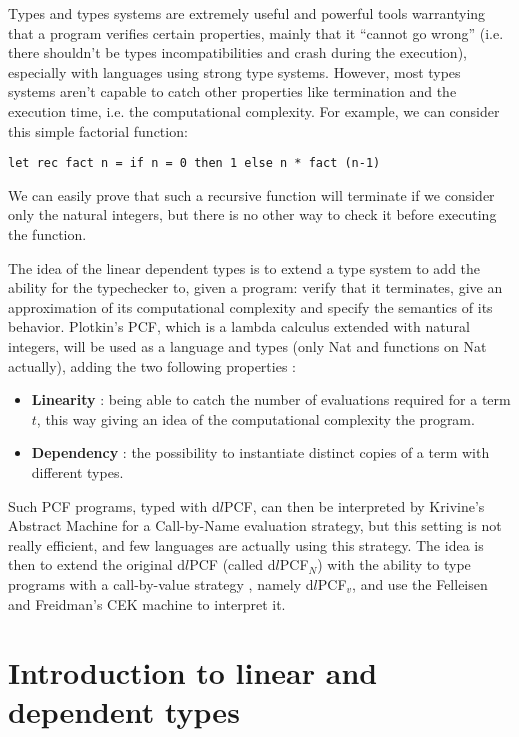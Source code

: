 \documentclass[a4paper,12pt]{article}
\begin{document}
Types and types systems are extremely useful and powerful tools
warrantying that a program verifies certain properties, mainly that
it ``cannot go wrong'' (i.e. there shouldn't be types
incompatibilities and crash during the execution), especially with
languages using strong type systems. However, most types systems
aren't capable to catch other properties like termination and the
execution time, i.e. the computational complexity. For example, we can
consider this simple factorial function:

\begin{verbatim}
let rec fact n = if n = 0 then 1 else n * fact (n-1)
\end{verbatim}

We can easily prove that such a recursive function will terminate if we consider
only the natural integers, but there is no other way to check it before
executing the function.

The idea of the linear dependent types \cite{ldtrc} is to extend a type system
to add the ability for the typechecker to, given a program: verify that it
terminates, give an approximation of its computational complexity and specify
the semantics of its behavior. Plotkin's PCF, which is a lambda calculus
extended with natural integers, will be used as a language and types (only Nat
and functions on Nat actually), adding the two following properties :

\begin{itemize}
\item \textbf{Linearity} : being able to catch the number of evaluations required
  for a term $t$, this way giving an idea of the computational complexity the
  program.
\item \textbf{Dependency} : the possibility to instantiate distinct copies of a term with
  different types.
\end{itemize}

Such PCF programs, typed with d$l$PCF, can then be interpreted by Krivine's
Abstract Machine for a Call-by-Name evaluation strategy, but this setting is not
really efficient, and few languages are actually using this strategy. The idea
is then to extend the original d$l$PCF (called d$l$PCF$_{N}$) with the ability to
type programs with a call-by-value strategy \cite{ldtcbv}, namely d$l$PCF$_{v}$,
  and use the Felleisen and Freidman's CEK machine to interpret it.

\section{Introduction to linear and dependent types}
\end{document}
